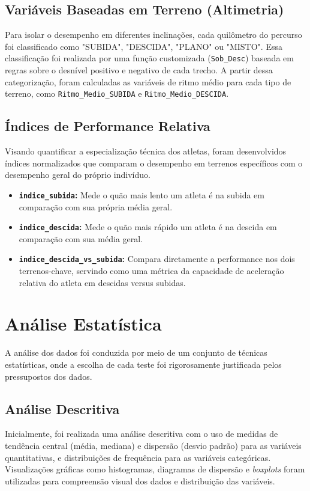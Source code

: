\subsection{Variáveis Baseadas em Terreno (Altimetria)}

Para isolar o desempenho em diferentes inclinações, cada quilômetro do percurso foi classificado como "SUBIDA", "DESCIDA", "PLANO" ou "MISTO". Essa classificação foi realizada por uma função customizada (\texttt{Sob\_Desc}) baseada em regras sobre o desnível positivo e negativo de cada trecho. A partir dessa categorização, foram calculadas as variáveis de ritmo médio para cada tipo de terreno, como \texttt{Ritmo\_Medio\_SUBIDA} e \texttt{Ritmo\_Medio\_DESCIDA}.

\subsection{Índices de Performance Relativa}

Visando quantificar a especialização técnica dos atletas, foram desenvolvidos índices normalizados que comparam o desempenho em terrenos específicos com o desempenho geral do próprio indivíduo.
\begin{itemize}
    \item \textbf{\texttt{indice\_subida}:} Mede o quão mais lento um atleta é na subida em comparação com sua própria média geral.
    \item \textbf{\texttt{indice\_descida}:} Mede o quão mais rápido um atleta é na descida em comparação com sua média geral.
    \item \textbf{\texttt{indice\_descida\_vs\_subida}:} Compara diretamente a performance nos dois terrenos-chave, servindo como uma métrica da capacidade de aceleração relativa do atleta em descidas versus subidas.
\end{itemize}

\section{Análise Estatística}
\label{sec:analise_estatistica}

A análise dos dados foi conduzida por meio de um conjunto de técnicas estatísticas, onde a escolha de cada teste foi rigorosamente justificada pelos pressupostos dos dados.

\subsection{Análise Descritiva}
Inicialmente, foi realizada uma análise descritiva com o uso de medidas de tendência central (média, mediana) e dispersão (desvio padrão) para as variáveis quantitativas, e distribuições de frequência para as variáveis categóricas. Visualizações gráficas como histogramas, diagramas de dispersão e \emph{boxplots} foram utilizadas para compreensão visual dos dados e distribuição das variáveis.

